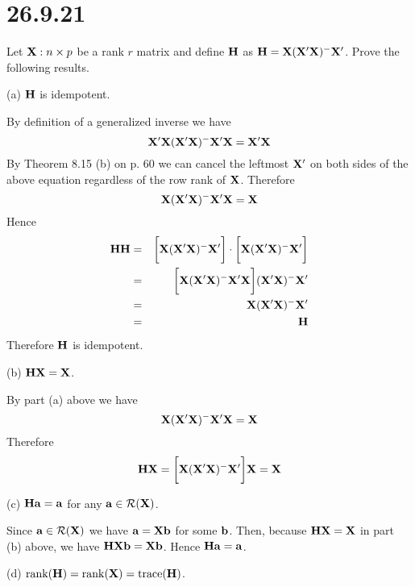 \section*{26.9.21}
Let ${\bf X}:n\times p$ be a rank $r$ matrix and define $\bf H$ as
${\bf H}={\bf X}({\bf X}'{\bf X})^{-{}}{\bf X}'$.
Prove the following results.

\bigskip
\noindent
(a) $\bf H$ is idempotent.

\bigskip
\noindent
By definition of a generalized inverse we have
$${\bf X}'{\bf X}({\bf X}'{\bf X})^{-{}}{\bf X}'{\bf X}
={\bf X}'{\bf X}$$
By Theorem 8.15 (b) on p. 60 we can cancel the leftmost ${\bf X}'$
on both sides of the above equation
regardless of the row rank of $\bf X$.
Therefore
$${\bf X}({\bf X}'{\bf X})^{-{}}{\bf X}'{\bf X}={\bf X}$$
Hence
\begin{eqnarray*}
{\bf HH}&=&
\bigg[{\bf X}({\bf X}'{\bf X})^{-{}}{\bf X}'\bigg]\cdot
\bigg[{\bf X}({\bf X}'{\bf X})^{-{}}{\bf X}'\bigg]\\
&=&\bigg[{\bf X}({\bf X}'{\bf X})^{-{}}
{\bf X}'{\bf X}\bigg]({\bf X}'{\bf X})^{-{}}{\bf X}'\\
&=&{\bf X}({\bf X}'{\bf X})^{-{}}{\bf X}'\\
&=&{\bf H}
\end{eqnarray*}
Therefore $\bf H$ is idempotent.

\bigskip
\noindent
(b) ${\bf HX}={\bf X}$.

\bigskip
\noindent
By part (a) above we have
$${\bf X}({\bf X}'{\bf X})^{-{}}{\bf X}'{\bf X}={\bf X}$$
Therefore
$${\bf HX}=\bigg[{\bf X}({\bf X}'{\bf X})^{-{}}{\bf X}'\bigg]
{\bf X}={\bf X}$$

\bigskip
\noindent
(c) ${\bf Ha}={\bf a}$ for any ${\bf a}\in{\cal R}({\bf X})$.

\bigskip
\noindent
Since ${\bf a}\in{\cal R}({\bf X})$ we have
${\bf a}={\bf Xb}$ for some $\bf b$.
Then, because ${\bf HX}={\bf X}$ in part (b) above,
we have ${\bf HXb}={\bf Xb}$.
Hence ${\bf Ha}={\bf a}$.

\bigskip
\noindent
(d) $\mathop{\rm rank}({\bf H})=\mathop{\rm rank}({\bf X})
=\mathop{\rm trace}({\bf H})$.

